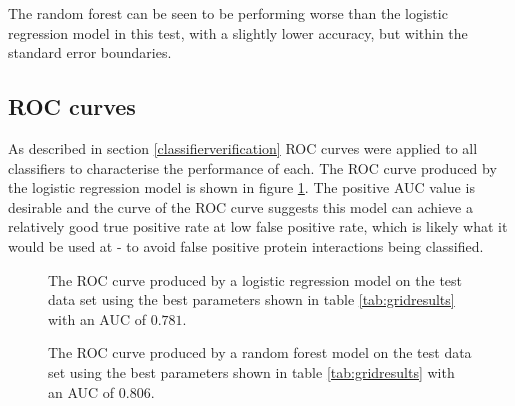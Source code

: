 The random forest can be seen to be performing worse than the logistic regression model in this test, with a slightly lower accuracy, but within the standard error boundaries.


\subsection{\ac{ROC} curves}

As described in section \ref{classifierverification} \ac{ROC} curves were applied to all classifiers to characterise the performance of each.
The \ac{ROC} curve produced by the logistic regression model is shown in figure \ref{fig:logroc}.
The positive \ac{AUC} value is desirable and the curve of the \ac{ROC} curve suggests this model can achieve a relatively good true positive rate at low false positive rate, which is likely what it would be used at - to avoid false positive protein interactions being classified.


\begin{figure}
    \centering
    \setlength\figureheight{2in}
    \setlength\figurewidth{3in}
    \caption{The \ac{ROC} curve produced by a logistic regression model on the test data set using the best parameters shown in table \ref{tab:gridresults} with an \ac{AUC} of $0.781$.}
    \label{fig:logroc}
\end{figure}

\begin{figure}
    \centering
    \setlength\figureheight{2in}
    \setlength\figurewidth{3in}
    \caption{The \ac{ROC} curve produced by a random forest model on the test data set using the best parameters shown in table \ref{tab:gridresults} with an \ac{AUC} of $0.806$.}
    \label{fig:rfroc}
\end{figure}


